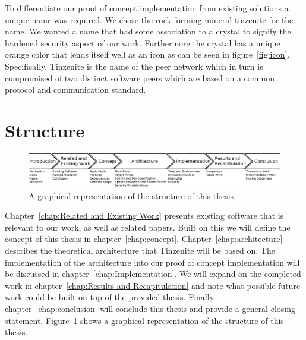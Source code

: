 To differentiate our proof of concept implementation from existing solutions a unique name was required.
We chose the rock-forming mineral tinzenite for the name.
We wanted a name that had some association to a crystal to signify the hardened security aspect of our work.
Furthermore the crystal has a unique orange color that lends itself well as an icon as can be seen in figure~\ref{fig:icon}.
Specifically, Tinzenite is the name of the peer network which in turn is compromised of two distinct software peers which are based on a common protocol and communication standard.

\section{Structure}
\label{sec:Structure}

\begin{figure}[H]
\centering
    \includegraphics[width=\linewidth]{diagram/thesis_structure}
\caption[Thesis Structure Diagram]{A graphical representation of the structure of this thesis.}
\label{fig:thesis_structure}
\end{figure}

Chapter~\ref{chap:Related and Existing Work} presents existing software that is relevant to our work, as well as related papers.
Built on this we will define the concept of this thesis in chapter~\ref{chap:concept}.
Chapter~\ref{chap:architecture} describes the theoretical architecture that Tinzenite will be based on.
The implementation of the architecture into our proof of concept implementation will be discussed in chapter~\ref{chap:Implementation}.
We will expand on the completed work in chapter~\ref{chap:Results and Recapitulation} and note what possible future work could be built on top of the provided thesis.
Finally chapter~\ref{chap:conclusion} will conclude this thesis and provide a general closing statement.
Figure~\ref{fig:thesis_structure} shows a graphical representation of the structure of this thesis.
